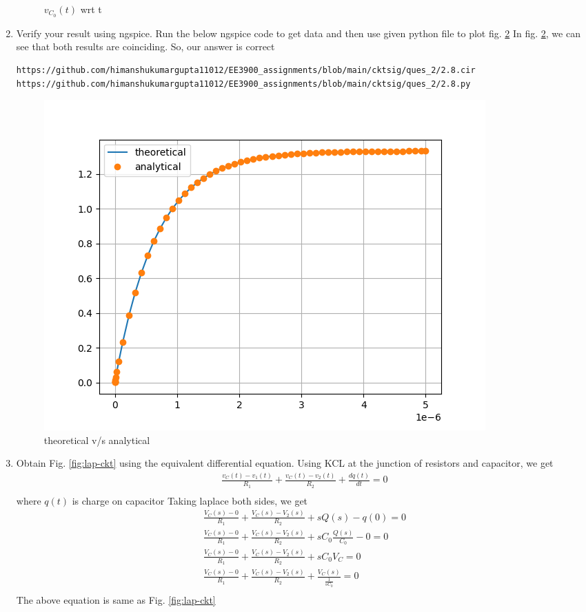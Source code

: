 \documentclass[journal,12pt,twocolumn]{IEEEtran}
\renewcommand\thesection{\arabic{section}}
\begin{document}
\begin{enumerate}[label=\arabic*.,ref=\thesection.\theenumi]
\begin{figure}[!ht]
\label{fig:v_t_1}
\caption{$v_{C_0}(t)$ wrt t}	
\end{figure}
	\item Verify your result using ngspice.
		\solution Run the below ngspice code to get data and then use given python file to plot fig. \ref{fig:2.8}
		In fig. \ref{fig:2.8}, we can see that both results are coinciding. So, our answer is correct
\begin{lstlisting}
https://github.com/himanshukumargupta11012/EE3900_assignments/blob/main/cktsig/ques_2/2.8.cir
https://github.com/himanshukumargupta11012/EE3900_assignments/blob/main/cktsig/ques_2/2.8.py
		\end{lstlisting}
\begin{figure}[!ht]
	\centering
	\includegraphics[width=\columnwidth]{./ques_2/2.8.png}
	\caption{theoretical v/s analytical}	
	\label{fig:2.8}
\end{figure}
	\item Obtain Fig. 
			\ref{fig:lap-ckt}
			using the equivalent differential equation.
			\solution Using KCL at the junction of resistors and capacitor, we get
			\begin{align}
				\frac{v_{C}(t)-v_1(t)}{R_1}+\frac{v_{C}(t)-v_{2}(t)}{R_2}+\frac{dq(t)}{dt}=0\\
			\end{align}
where $q(t)$ is charge on capacitor
Taking laplace both sides, we get
\begin{align}
	\frac{V_{C}(s)-0}{R_1}+\frac{V_{C}(s)-V_{2}(s)}{R_2}+sQ(s)-q(0)=0\\
	\frac{V_{C}(s)-0}{R_1}+\frac{V_{C}(s)-V_{2}(s)}{R_2}+sC_0\frac{Q(s)}{C_0}-0=0\\
	\frac{V_{C}(s)-0}{R_1}+\frac{V_{C}(s)-V_{2}(s)}{R_2}+sC_0V_{C}=0\\
	\frac{V_{C}(s)-0}{R_1}+\frac{V_{C}(s)-V_{2}(s)}{R_2}+\frac{V_{C}(s)}{\frac{1}{sC_0}}=0\\
\end{align}
The above equation is same as Fig. \ref{fig:lap-ckt} 
\end{enumerate}
\end{document}
